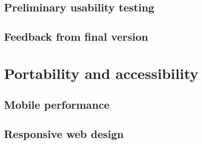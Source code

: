 \documentclass[bsc,frontabs,twoside,singlespacing,parskip]{infthesis}     %
\begin{document}
		\subsection{Preliminary usability testing}

		\subsection{Feedback from final version}


	\section{Portability and accessibility}\label{portability_eval}

		\subsection{Mobile performance}


		\subsection{Responsive web design}
\end{document}
